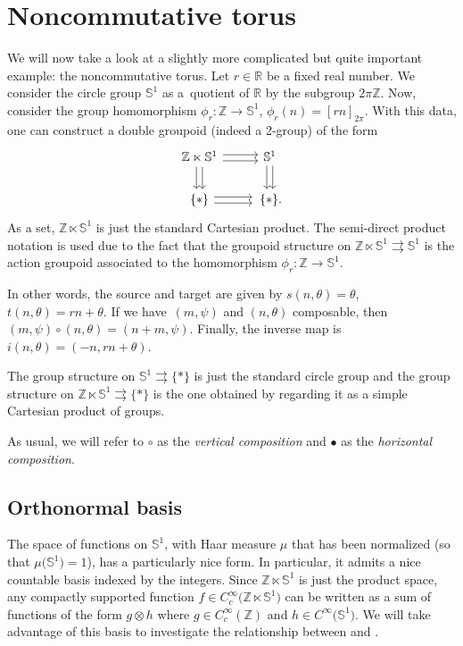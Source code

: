 \documentclass[pdftex]{sigma}
\numberwithin{equation}{section}
\theoremstyle{definition}
\newcommand{\BBR}{\mathbb{R}}
\newcommand{\BBZ}{\mathbb{Z}}
\newcommand{\BBS}{\mathbb{S}}
\newcommand{\stardot}{\overset{{\bullet}}{*}}
\newcommand{\starcirc}{\overset{\circ}{*}}
\newcommand{\darrow}{\arrow[d, shift right] \arrow[d, shift left]}
\newcommand{\rarrow}{\arrow[r, shift right] \arrow[r, shift left]}
\newcommand{\grpd}{\rightrightarrows}
\begin{document}
\section{Noncommutative torus}\label{Section:noncommutative.torus}
We will now take a look at a slightly more complicated but quite important example: the noncom\-mutative torus. Let $ r \in \BBR $ be a fixed real number.
We consider the circle group $ \BBS^1 $ as a~quotient of $ \BBR $ by the subgroup $ 2 \pi \BBZ $. Now, consider the group homomorphism
$\phi_r \colon \BBZ \to \BBS^1$, $\phi_r(n) = [rn]_{2 \pi}$.
With this data, one can construct a double groupoid (indeed a 2-group) of the form
 \[\begin{tikzcd}
\BBZ \ltimes \BBS^1 \darrow \rarrow & \BBS^1 \darrow \\
\{ * \} \rarrow &\, \{ * \}.
\end{tikzcd}
\]
As a set, $ \BBZ \ltimes \BBS^1 $ is just the standard Cartesian product.
The semi-direct product notation is used due to the fact that the groupoid structure on $ \BBZ \ltimes \BBS^1 \grpd \BBS^1 $ is the action groupoid associated to the homomorphism $ \phi_r \colon \BBZ \to \BBS^1 $.

In other words, the source and target are given by
$s(n,\theta) = \theta$, $ t(n,\theta) = rn + \theta$.
If we have~$ (m,\psi) $ and $ (n,\theta)$ composable, then
$(m,\psi) \circ (n, \theta) = (n + m, \psi)$.
Finally, the inverse map is
$i(n,\theta) = (-n, rn + \theta) $.

The group structure on $ \BBS^1 \grpd \{ * \} $ is just the standard circle group and the group structure on $ \BBZ \ltimes \BBS^1 \grpd \{ * \} $ is the one obtained by regarding it as a simple Cartesian product of groups.

As usual, we will refer to $ \circ $ as the \emph{vertical composition} and $ \bullet $ as the \emph{horizontal composition}.

\subsection{Orthonormal basis}
The space of functions on $ \BBS^1 $, with Haar measure $\mu$ that has been normalized \big(so that $\mu\big(\BBS^1\big)=1$\big), has a particularly nice form. In particular, it admits a nice countable basis indexed by the integers. Since $ \BBZ \ltimes \BBS^1 $ is just the product space, any compactly supported function ${f\in C_c^\infty\big(\BBZ \ltimes \BBS^1 \big)}$ can be written as a sum of functions of the form $g \otimes h$ where $g\in C_c^\infty(\BBZ)$ and $h\in C^\infty\big(\BBS^1\big)$. We will take advantage of this basis to investigate the relationship between \smash{$ \stardot $} and \smash{$ \starcirc $}.
\end{document}
